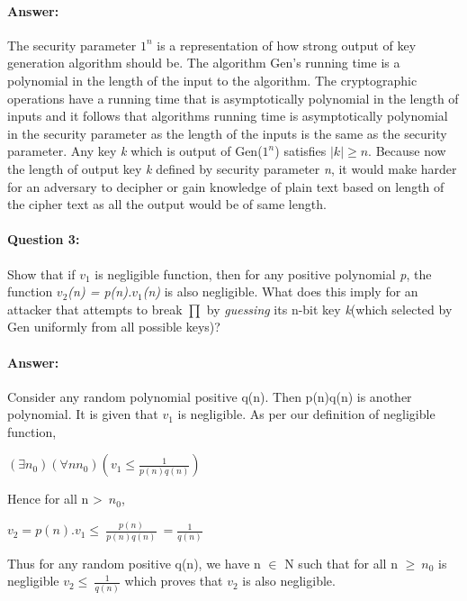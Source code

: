 \documentclass{article}
\begin{document}
    \paragraph{Answer: \newline}
        The security parameter $1^n$ is a representation of how strong output of key generation algorithm should be. The algorithm Gen's running time is a polynomial in the length of the input to the algorithm. The cryptographic operations have a running time that is asymptotically polynomial in the length of inputs and it follows that algorithms running time is asymptotically polynomial in the security parameter as the length of the inputs is the same as the security parameter. \newline
        Any key \emph{k} which is output of Gen($1^n$) satisfies $|k|\geq n$. Because now the length of output key \emph{k} defined by security parameter \emph{n}, it would make harder for an adversary to decipher or gain knowledge of plain text based on length of the cipher text as all the output would be of same length.
    
    \paragraph{Question 3:} Show that if \emph{$v_1$} is negligible function, then for any positive polynomial \emph{p}, the function \emph{$v_2$(n) = p(n).$v_1$(n)} is also negligible. What does this imply for an attacker that attempts to break $\prod$ by \emph{guessing} its n-bit key \emph{k}(which selected by Gen uniformly from all possible keys)?
    
    \paragraph{Answer: \newline}
        Consider any random polynomial positive q(n). Then p(n)q(n) is another polynomial. It is given that \emph{$v_1$} is negligible. As per our definition of negligible function,
        \begin{center}
            \begin{math}
                (\exists n_0)(\forall nn_0)(v_1\leq \frac{1}{p(n)q(n)})            
            \end{math}
        \end{center}
        Hence for all n \textgreater\ $n_0$,
        \begin{center}
            \begin{math}
                v_2 = p(n).v_1 \leq\ \frac{p(n)}{p(n)q(n)}\ = \frac{1}{q(n)}
            \end{math}
        \end{center}
        Thus for any random positive q(n), we have n $\in$ N such that for all n $\geq\ n_0$ is negligible $v_2 \leq\ \frac{1}{q(n)}$ which proves that $v_2$ is also negligible.
    \citep{section1question3}
    
\end{document}

